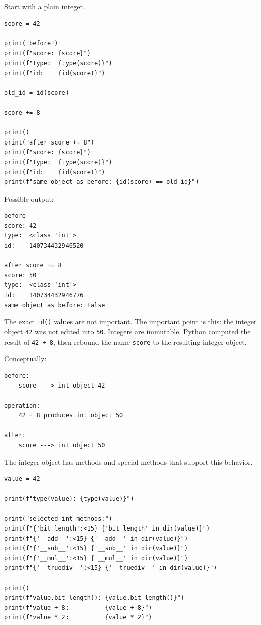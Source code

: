 Start with a plain integer.

\begin{verbatim}
score = 42

print("before")
print(f"score: {score}")
print(f"type:  {type(score)}")
print(f"id:    {id(score)}")

old_id = id(score)

score += 8

print()
print("after score += 8")
print(f"score: {score}")
print(f"type:  {type(score)}")
print(f"id:    {id(score)}")
print(f"same object as before: {id(score) == old_id}")
\end{verbatim}

Possible output:

\begin{verbatim}
before
score: 42
type:  <class 'int'>
id:    140734432946520

after score += 8
score: 50
type:  <class 'int'>
id:    140734432946776
same object as before: False
\end{verbatim}

The exact \texttt{id()} values are not important. The important point is this: the integer object \texttt{42} was not edited into \texttt{50}. Integers are immutable. Python computed the result of \texttt{42 + 8}, then rebound the name \texttt{score} to the resulting integer object.

Conceptually:

\begin{verbatim}
before:
    score ---> int object 42

operation:
    42 + 8 produces int object 50

after:
    score ---> int object 50
\end{verbatim}

The integer object has methods and special methods that support this behavior.

\begin{verbatim}
value = 42

print(f"type(value): {type(value)}")

print("selected int methods:")
print(f"{'bit_length':<15} {'bit_length' in dir(value)}")
print(f"{'__add__':<15} {'__add__' in dir(value)}")
print(f"{'__sub__':<15} {'__sub__' in dir(value)}")
print(f"{'__mul__':<15} {'__mul__' in dir(value)}")
print(f"{'__truediv__':<15} {'__truediv__' in dir(value)}")

print()
print(f"value.bit_length(): {value.bit_length()}")
print(f"value + 8:          {value + 8}")
print(f"value * 2:          {value * 2}")
\end{verbatim}

